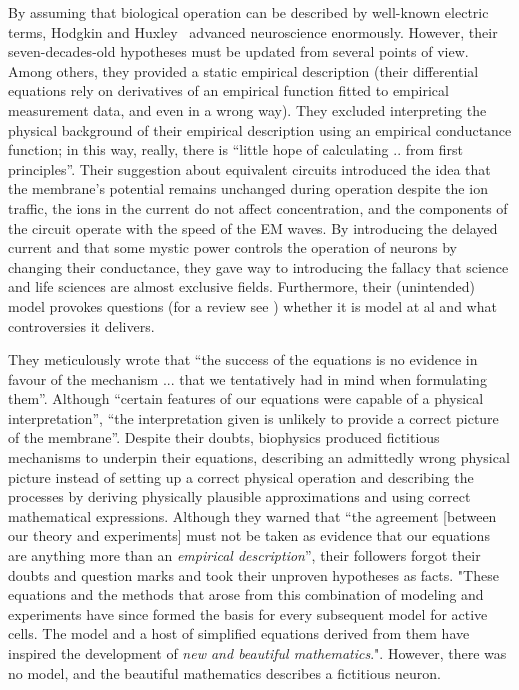By assuming that biological operation can be described by well-known
electric terms, Hodgkin and Huxley~\cite{HodgkinHuxley:1952} advanced
neuroscience enormously. However, their seven-decades-old hypotheses
must be updated from several points of view. Among others, they provided
a static empirical description (their differential equations rely
on derivatives of an empirical function fitted to empirical measurement
data, and even in a wrong way). They excluded interpreting the physical
background of their empirical description using an empirical conductance
function; in this way, really, there is ``little hope of calculating
.. from first principles''. Their suggestion about equivalent circuits
introduced the idea that the membrane's potential remains unchanged
during operation despite the ion traffic, the ions in the current
do not affect concentration, and the components of the circuit operate
with the speed of the %
EM
 waves. By introducing the delayed
current and that some mystic power controls the operation of neurons
by changing their conductance, they gave way to introducing the fallacy
that science and life sciences are almost exclusive fields. Furthermore,
their (unintended) model provokes questions (for a review see \cite{HH_Potential_Controversies_2017})
whether it is model at al and what controversies it delivers.

They meticulously wrote that ``the success of the equations is no
evidence in favour of the mechanism ... that we tentatively had in
mind when formulating them''. Although ``certain features of our
equations were capable of a physical interpretation'', ``the interpretation
given is unlikely to provide a correct picture of the membrane''.
Despite their doubts, biophysics produced fictitious mechanisms to
underpin their equations, describing an admittedly wrong physical
picture instead of setting up a correct physical operation and describing
the processes by deriving physically plausible approximations and
using correct mathematical expressions. Although they warned that
``the agreement {[}between our theory and experiments{]} must not
be taken as evidence that our equations are anything more than an
\emph{empirical description}'', their followers forgot their doubts
and question marks and took their unproven hypotheses as facts. "These
equations and the methods that arose from this combination of modeling
and experiments have since formed the basis for every subsequent model
for active cells. The model and a host of simplified equations derived
from them have inspired the development of \emph{new and beautiful
mathematics}."\cite{MathNeuroscience:2010}. However,
there was no model, and the beautiful mathematics describes a fictitious
neuron.

